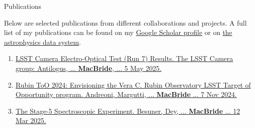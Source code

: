 \documentclass{resume} %
\begin{document}
\begin{rSection}{Publications}


Below are selected publications from different collaborations and projects. A full list of my publications can be found on my \href{https://scholar.google.com/citations?user=XtRTswUAAAAJ&hl=en}{Google Scholar profile} or on \href{https://ui.adsabs.harvard.edu/search/fq=\%7B!type\%3Daqp\%20v\%3D\%24fq_database\%7D&fq_database=(database\%3Aastronomy\%20OR\%20database\%3Aphysics)&p_=0&q=((\%20author\%3A\%22Macbride\%2C\%20Sean\%22)\%20AND\%20year\%3A2019-2150)&sort=date\%20desc\%2C\%20bibcode\%20desc}{the astrophysics data system}.

\begin{enumerate}
    \item \href{https://sitcomtn-148.lsst.io/}{LSST Camera Electro-Optical Test (Run 7) Results. The LSST Camera group: Antilogus, ... \textbf{MacBride}, ... 5 May 2025.}
    \item \href{https://arxiv.org/abs/2411.04793}{Rubin ToO 2024: Envisioning the Vera C. Rubin Observatory LSST Target of Opportunity program. Andreoni, Margutti, ... \textbf{MacBride} ... 7 Nov 2024.} 
    \item \href{https://arxiv.org/abs/2503.07923}{The Stage-5 Spectroscopic Experiment. Besuner, Dey, ... \textbf{MacBride} ... 12 Mar 2025.}    


\end{enumerate}
\end{rSection}
\end{document}
